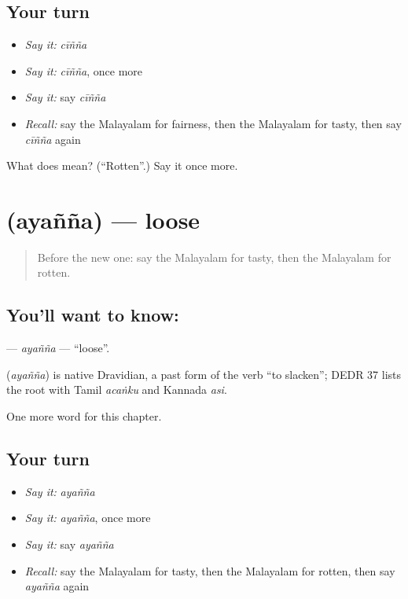 \subsection*{Your turn}
\begin{itemize}
\raggedright
  \item \emph{Say it:} \emph{cīñña}
  \item \emph{Say it:} \emph{cīñña}, once more
  \item \emph{Say it:} say \emph{cīñña}
  \item \emph{Recall:} say the Malayalam for fairness, then the Malayalam for tasty, then say \emph{cīñña} again
\end{itemize}

\begin{tcolorbox}[breakable,colback=teal!4,colframe=teal!35!black,title={Before you move on}]
What does  mean? (\textquotedblleft{}Rotten\textquotedblright{}.) Say it once more.
\end{tcolorbox}
\section[\texorpdfstring{\ml{അയഞ്ഞ} (ayañña)}{അയഞ്ഞ (ayañña)}]{ (ayañña) — loose}

\label{lesson:ML-C203-ayanna}



\begin{quote}
Before the new one: say the Malayalam for tasty, then the Malayalam for rotten.
\end{quote}

\subsection*{You'll want to know: }
\textbf{} — \emph{ayañña} — \textquotedblleft{}loose\textquotedblright{}.

\begin{cousinweb}
\textbf{} (\emph{ayañña}) is native Dravidian, a past form of the verb \textquotedblleft{}to slacken\textquotedblright{}; DEDR 37 lists the root with Tamil \emph{acaṅku} and Kannada \emph{asi}.
\end{cousinweb}

\begin{grammarlens}[title={What you've built}]
One more word for this chapter.
\end{grammarlens}

\subsection*{Your turn}
\begin{itemize}
\raggedright
  \item \emph{Say it:} \emph{ayañña}
  \item \emph{Say it:} \emph{ayañña}, once more
  \item \emph{Say it:} say \emph{ayañña}
  \item \emph{Recall:} say the Malayalam for tasty, then the Malayalam for rotten, then say \emph{ayañña} again
\end{itemize}


